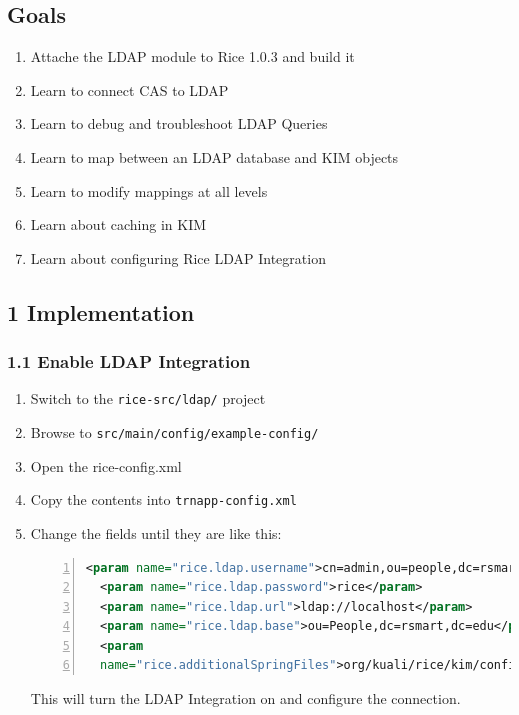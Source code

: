 \subsection*{Goals}
\begin{enumerate}
  \item Attache the LDAP module to Rice 1.0.3 and build it
  \item Learn to connect CAS to LDAP
  \item Learn to debug and troubleshoot LDAP Queries
  \item Learn to map between an LDAP database and KIM objects
  \item Learn to modify mappings at all levels
  \item Learn about caching in KIM
  \item Learn about configuring Rice LDAP Integration
\end{enumerate}

\subsection*{1 Implementation}
\subsubsection*{1.1 Enable LDAP Integration}
\begin{enumerate}
\item Switch to the \verb|rice-src/ldap/| project
\item Browse to \verb|src/main/config/example-config/|
\item Open the rice-config.xml
\item Copy the contents into \verb|trnapp-config.xml|
\item Change the fields until they are like this:
\begin{lstlisting}[numbers=left,language=xml,basicstyle=\scriptsize,backgroundcolor=\color{ubergray},caption={trnapp-config.xml},frame=single,breaklines=true]
  <param name="rice.ldap.username">cn=admin,ou=people,dc=rsmart,dc=com</param>
  <param name="rice.ldap.password">rice</param>
  <param name="rice.ldap.url">ldap://localhost</param>
  <param name="rice.ldap.base">ou=People,dc=rsmart,dc=edu</param>
  <param
  name="rice.additionalSpringFiles">org/kuali/rice/kim/config/KIMLdapSpringBeans.xml</param>
\end{lstlisting}
This will turn the LDAP Integration on and configure the connection.
\end{enumerate}

